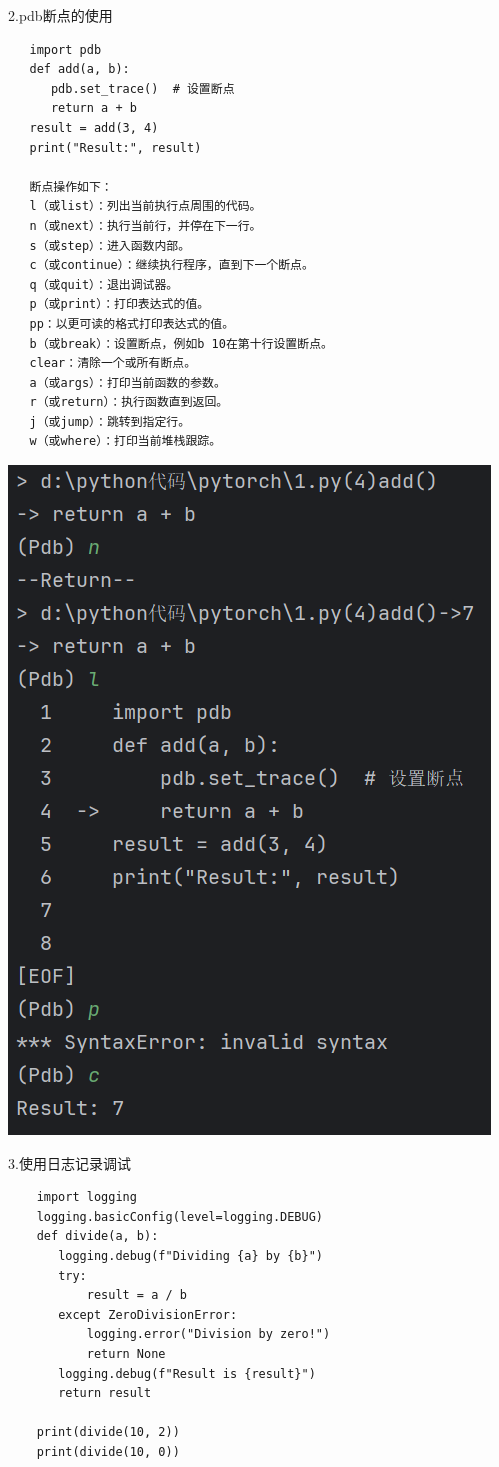 \documentclass{article}
\begin{document}
2.pdb断点的使用
\begin{verbatim}
   import pdb
   def add(a, b):
      pdb.set_trace()  # 设置断点
      return a + b
   result = add(3, 4)
   print("Result:", result)
  
   断点操作如下：
   l（或list）：列出当前执行点周围的代码。
   n（或next）：执行当前行，并停在下一行。
   s（或step）：进入函数内部。
   c（或continue）：继续执行程序，直到下一个断点。
   q（或quit）：退出调试器。
   p（或print）：打印表达式的值。
   pp：以更可读的格式打印表达式的值。
   b（或break）：设置断点，例如b 10在第十行设置断点。
   clear：清除一个或所有断点。
   a（或args）：打印当前函数的参数。
   r（或return）：执行函数直到返回。
   j（或jump）：跳转到指定行。
   w（或where）：打印当前堆栈跟踪。
 \end{verbatim}


\noindent
\begin{minipage}{\linewidth}
  \centering
  \includegraphics[width=0.5\linewidth]{学习2.png}
  \label{fig:example}
\end{minipage}

3.使用日志记录调试
 \begin{verbatim}
    import logging
    logging.basicConfig(level=logging.DEBUG)
    def divide(a, b):
       logging.debug(f"Dividing {a} by {b}")
       try:
           result = a / b
       except ZeroDivisionError:
           logging.error("Division by zero!")
           return None
       logging.debug(f"Result is {result}")
       return result
  
    print(divide(10, 2))
    print(divide(10, 0))
 \end{verbatim}
\end{document}
